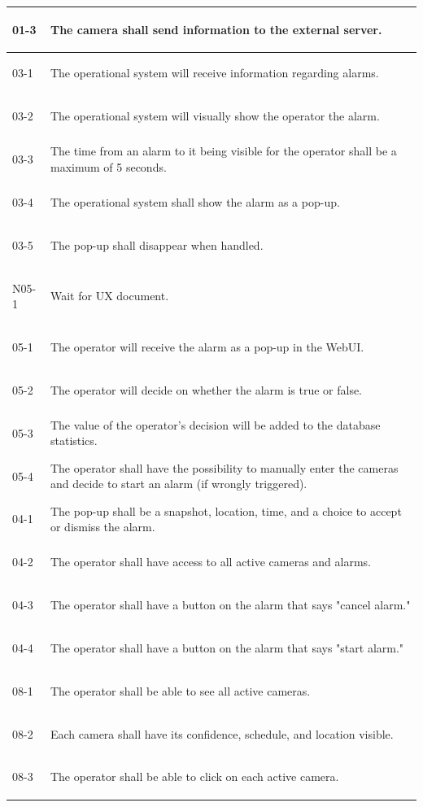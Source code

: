 \documentclass{article}
\begin{document}
\begin{longtable}{|l|p{15cm}|}
\hline
\hypertarget{01-3}{01-3} & The camera shall send information to the external server. \\
\hline
\hypertarget{03-1}{03-1} & The operational system will receive information regarding alarms. \\
\hline
\hypertarget{03-2}{03-2} & The operational system will visually show the operator the alarm. \\
\hline
\hypertarget{03-3}{03-3} & The time from an alarm to it being visible for the operator shall be a maximum of 5 seconds. \\
\hline
\hypertarget{03-4}{03-4} & The operational system shall show the alarm as a pop-up. \\
\hline
\hypertarget{03-5}{03-5} & The pop-up shall disappear when handled. \\
\hline
\hypertarget{N05-1}{N05-1} & Wait for UX document. \\
\hline
\hypertarget{05-1}{05-1} & The operator will receive the alarm as a pop-up in the WebUI. \\
\hline
\hypertarget{05-2}{05-2} & The operator will decide on whether the alarm is true or false. \\
\hline
\hypertarget{05-3}{05-3} & The value of the operator’s decision will be added to the database statistics. \\
\hline
\hypertarget{05-4}{05-4} & The operator shall have the possibility to manually enter the cameras and decide to start an alarm (if wrongly triggered). \\
\hline
\hypertarget{04-1}{04-1} & The pop-up shall be a snapshot, location, time, and a choice to accept or dismiss the alarm. \\
\hline
\hypertarget{04-2}{04-2} & The operator shall have access to all active cameras and alarms. \\
\hline
\hypertarget{04-3}{04-3} & The operator shall have a button on the alarm that says "cancel alarm." \\
\hline
\hypertarget{04-4}{04-4} & The operator shall have a button on the alarm that says "start alarm." \\
\hline
\hypertarget{08-1}{08-1} & The operator shall be able to see all active cameras. \\
\hline
\hypertarget{08-2}{08-2} & Each camera shall have its confidence, schedule, and location visible. \\
\hline
\hypertarget{08-3}{08-3} & The operator shall be able to click on each active camera. \\

\end{longtable}
\end{document}
